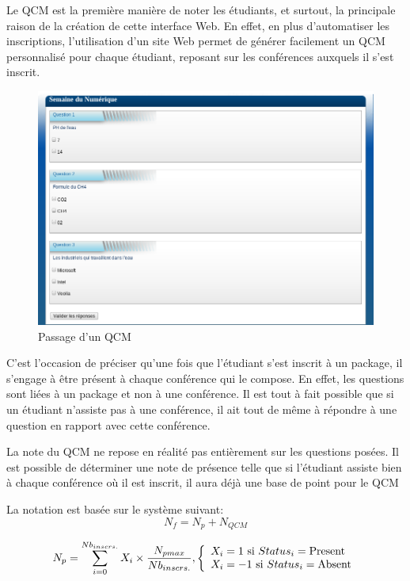 Le QCM est la première manière de noter les étudiants, et surtout, la principale
raison de la création de cette interface Web. En effet, en plus d'automatiser les
inscriptions, l'utilisation d'un site Web permet de générer facilement un QCM
personnalisé pour chaque étudiant, reposant sur les conférences auxquels il s'est inscrit.

    \begin{figure}[h]
        \begin{center}
        \includegraphics[scale=0.4]{images/screenshotQCM.png} 
        \end{center}
        \caption{Passage d'un QCM}
        \label{Passage d'un QCM}
    \end{figure}

C'est l'occasion de préciser qu'une fois que l'étudiant s'est inscrit à un package,
il s'engage à être présent à chaque conférence qui le compose. En effet, les
questions sont liées à un package et non à une conférence.
Il est tout à fait possible que si un étudiant n'assiste pas à une conférence,
il ait tout de même à répondre à une question en rapport avec cette conférence.

La note du QCM ne repose en réalité pas entièrement sur les questions posées.
Il est possible de déterminer une note de présence telle que si l'étudiant assiste
bien à chaque conférence où il est inscrit, il aura déjà une base de point pour le QCM

La notation est basée sur le système suivant:
\begin{equation}N_{f} = N_{p} + N_{QCM}\end{equation}

\begin{equation}
    N_{p} = \sum_{i = 0}^{Nb_{inscrs.}} X_{i} \times \frac{N_{pmax}}{Nb_{inscrs.}} {,}
    \left\{
    \begin{array}{l l}
        X_{i} = 1 \text{ si }Status_{i} = \text{Present}\\
        X_{i} = -1\text{ si }Status_{i} = \text{Absent}\\
    \end{array}
    \right.
\end{equation}

